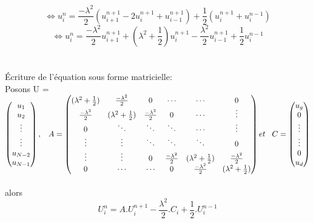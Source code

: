\begin{equation*}
\Leftrightarrow u^{n}_{i} = \frac{-\lambda ^2}{2} (u^{n+1}_{i+1} - 2u^{n+1}_{i} + u^{n+1}_{i-1}) + \frac{1}{2} (u^{n+1}_{i} + u^{n-1}_{i})
\end{equation*}
\begin{equation*}
\Leftrightarrow
\boxed{
u^{n}_{i} = \frac{-\lambda ^2}{2}u^{n+1}_{i+1} + (\lambda^2 + \frac{1}{2})u^{n+1}_{i} - \frac{\lambda ^2}{2}u^{n+1}_{i-1} + \frac{1}{2} u^{n-1}_{i}}
\end{equation*} \\\\
Écriture de l'équation sous forme matricielle: \vspace{3 mm}\\

Posons U = 
\begin{math}
\begin{pmatrix}
u_{1}\\
u_{2}\\
\vdots \\
\vdots \\
u_{N-2}\\
u_{N-1}
\end{pmatrix}
, \hspace{3 mm} A = 
\begin{pmatrix}
(\lambda ^2 + \frac{1}{2}) & \frac{-\lambda ^2}{2} & 0 & \cdots & \cdots & 0\\
\frac{-\lambda ^2}{2} & (\lambda ^2 + \frac{1}{2}) & \frac{-\lambda ^2}{2} & 0 & \cdots & \vdots\\
0 & \ddots & \ddots & \ddots & \cdots & \vdots\\
\vdots & \vdots & \ddots & \ddots & \ddots & 0\\
\vdots & \vdots & 0 &\frac{-\lambda ^2}{2} & (\lambda ^2 + \frac{1}{2}) & \frac{-\lambda ^2}{2} \\
0 & \cdots & \cdots & 0 & \frac{-\lambda ^2}{2} & (\lambda ^2 + \frac{1}{2})
\end{pmatrix}
et \hspace{3 mm} C = 
\begin{pmatrix}
u_{g}\\
0 \\
\vdots \\
\vdots \\
0 \\
u_{d}
\end{pmatrix}
\end{math}\\\\
alors
\begin{equation*}
U^{n}_i = A.U^{n+1}_i - \frac{\lambda^2}{2}.C_i+\frac{1}{2}.U^{n-1}_i
\end{equation*}

